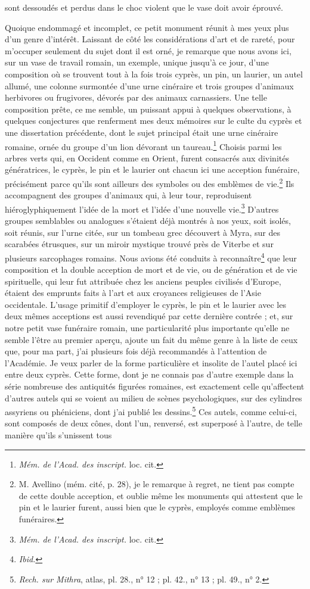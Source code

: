 \documentclass{article}
\begin{document}
sont dessoudés et perdus dans le choc violent que le vase doit avoir éprouvé.

Quoique endommagé et incomplet, ce petit monument réunit à mes yeux plus d'un genre d'intérêt. Laissant de côté les considérations d'art et de rareté, pour m'occuper seulement du sujet dont il est orné, je remarque que nous avons ici, sur un vase de travail romain, un exemple, unique jusqu'à ce jour, d'une composition où se trouvent tout à la fois trois cyprès, un pin, un laurier, un autel allumé, une colonne surmontée d'une urne cinéraire et trois groupes d'animaux herbivores ou frugivores, dévorés par des animaux carnassiers. Une telle composition prête, ce me semble, un puissant appui à quelques observations, à quelques conjectures que renferment mes deux mémoires sur le culte du cyprès et une dissertation précédente, dont le sujet principal était une urne cinéraire romaine, ornée du groupe d'un lion dévorant un taureau.\footnote{\emph{Mém. de l'Acad. des inscript.} loc. cit.} Choisis parmi les arbres verts qui, en Occident comme en Orient, furent consacrés aux divinités génératrices, le cyprès, le pin et le laurier ont chacun ici une acception funéraire, précisément parce qu'ils sont ailleurs des symboles ou des emblèmes de vie.\footnote{M. Avellino (mém. cité, p. 28), je le remarque à regret, ne tient pas compte de cette double acception, et oublie même les monuments qui attestent que le pin et le laurier furent, aussi bien que le cyprès, employés comme emblèmes funéraires.} Ils accompagnent des groupes d'animaux qui, à leur tour, reproduisent hiéroglyphiquement l'idée de la mort et l'idée d'une nouvelle vie.\footnote{\emph{Mém. de l'Acad. des inscript.} loc. cit.} D'autres groupes semblables ou analogues s'étaient déjà montrés à nos yeux, soit isolés, soit réunis, sur l'urne citée, sur un tombeau grec découvert à Myra, sur des scarabées étrusques, sur un miroir mystique trouvé près de Viterbe et sur plusieurs sarcophages romains. Nous avions été conduits à reconnaître\footnote{\emph{Ibid.}} que leur composition et la double acception de mort et de vie, ou de génération et de vie spirituelle, qui leur fut attribuée chez les anciens peuples civilisés d'Europe, étaient des emprunts faits à l'art et aux croyances religieuses de l'Asie occidentale. L'usage primitif d'employer le cyprès, le pin et le laurier avec les deux mêmes acceptions est aussi revendiqué par cette dernière contrée ; et, sur notre petit vase funéraire romain, une particularité plus importante qu'elle ne semble l'être au premier aperçu, ajoute un fait du même genre à la liste de ceux que, pour ma part, j'ai plusieurs fois déjà recommandés à l'attention de l'Académie. Je veux parler de la forme particulière et insolite de l'autel placé ici entre deux cyprès. Cette forme, dont je ne connais pas d'autre exemple dans la série nombreuse des antiquités figurées romaines, est exactement celle qu'affectent d'autres autels qui se voient au milieu de scènes psychologiques, sur des cylindres assyriens ou phéniciens, dont j'ai publié les dessins.\footnote{\emph{Rech. sur Mithra}, atlas, pl. 28., n° 12 ; pl. 42., n° 13 ; pl. 49., n° 2.} Ces autels, comme celui-ci, sont composés de deux cônes, dont l'un, renversé, est superposé à l'autre, de telle manière qu'ils s'unissent tous 
\end{document}
